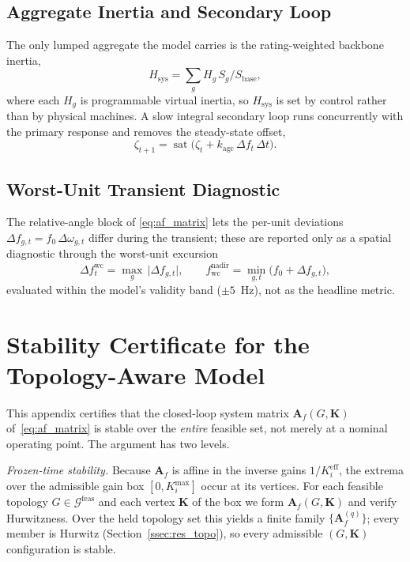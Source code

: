 \documentclass[lettersize,journal]{IEEEtran}
\begin{document}
\subsection{Aggregate Inertia and Secondary Loop}
The only lumped aggregate the model carries is the rating-weighted backbone inertia,
\begin{equation}
  H_{\mathrm{sys}}=\sum_g H_g\,S_g/S_{\mathrm{base}},
  \label{eq:hsys}
\end{equation}
where each $H_g$ is programmable virtual inertia, so $H_{\mathrm{sys}}$ is set by control rather than by physical machines. A slow integral secondary loop runs concurrently with the primary response and removes the steady-state offset,
\begin{equation}
  \zeta_{t+1}=\operatorname{sat}\!\big(\zeta_t+k_{\mathrm{agc}}\,\Delta f_t\,\Delta t\big).
  \label{eq:agc}
\end{equation}

\subsection{Worst-Unit Transient Diagnostic}
The relative-angle block of \eqref{eq:af_matrix} lets the per-unit deviations $\Delta f_{g,t}=f_0\,\Delta\omega_{g,t}$ differ during the transient; these are reported only as a spatial diagnostic through the worst-unit excursion
\begin{equation}
  \Delta f^{\mathrm{wc}}_t=\max_{g}\,\big|\Delta f_{g,t}\big|,
  \qquad
  f^{\mathrm{nadir}}_{\mathrm{wc}}=\min_{g,t}\big(f_0+\Delta f_{g,t}\big),
  \label{eq:worstunit}
\end{equation}
evaluated within the model's validity band ($\pm5$~Hz), not as the headline metric.

\section{Stability Certificate for the Topology-Aware Model}
\label{app:lyapunov}

This appendix certifies that the closed-loop system matrix
$\mathbf{A}_f(G,\mathbf{K})$ of~\eqref{eq:af_matrix} is stable over
the \emph{entire} feasible set, not merely at a nominal operating
point. The argument has two levels.

\emph{Frozen-time stability.} Because $\mathbf{A}_f$ is affine in
the inverse gains $1/K^{\mathrm{eff}}_i$, the extrema over the
admissible gain box $[0,K_i^{\max}]$ occur at its vertices. For
each feasible topology $G\in\mathcal{G}^{\mathrm{feas}}$ and each
vertex $\mathbf{K}$ of the box we form $\mathbf{A}_f(G,\mathbf{K})$
and verify Hurwitzness. Over the held topology set this yields a
finite family $\{\mathbf{A}_f^{(q)}\}$; every member is Hurwitz
(Section~\ref{ssec:res_topo}), so every admissible
$(G,\mathbf{K})$ configuration is stable.
\end{document}
